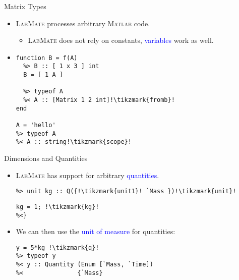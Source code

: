 \documentclass[]{beamer}
\newcommand{\tikzmark}[1]{\tikz[overlay,remember picture,baseline=-0.5ex] \node (#1) {};}
\newcommand{\keyword}[1]{\textcolor{blue}{#1}}
\newcommand{\lm}{\textsc{LabMate}\xspace}
\newcommand{\ma}{\textsc{Matlab}\xspace}
\begin{document}
\begin{frame}[fragile]{Matrix Types}
  \begin{itemize}[<+->]
  \item \lm processes arbitrary \ma code.
    \smallskip
    \begin{itemize}[<.->]
    \item \lm does not rely on constants, \keyword{variables} work as well.
    \end{itemize}
  \item
\begin{lstlisting}[xleftmargin=0em]
function B = f(A)
  %> B :: [ 1 x 3 ] int
  B = [ 1 A ]

  %> typeof A
  %< A :: [Matrix 1 2 int]!\tikzmark{fromb}!
end

A = 'hello'
%> typeof A
%< A :: string!\tikzmark{scope}!
\end{lstlisting}
   \pause
  \end{itemize}
\end{frame}

\begin{frame}[fragile]{Dimensions and Quantities}
  \begin{itemize}[<+->]
  \item \lm has support for arbitrary \keyword{quantities}.
    \begin{lstlisting}[xleftmargin=0em,belowskip=-1em]
%> dimensions V for Q over `Mass!\tikzmark{base}!, `Time
%> unit kg :: Q({!\tikzmark{unit1}! `Mass })!\tikzmark{unit}!
\end{lstlisting}
\pause
\begin{lstlisting}[xleftmargin=0em]
%<{
kg = 1; !\tikzmark{kg}!
%<}
\end{lstlisting}
\pause
\pause
\item We can then use the \keyword{unit of measure} for quantities:
\begin{lstlisting}[xleftmargin=0em]
y = 5*kg !\tikzmark{q}!
%> typeof y
%< y :: Quantity (Enum [`Mass, `Time])
%<               {`Mass}
\end{lstlisting}
  \end{itemize}
\end{frame}
\end{document}
